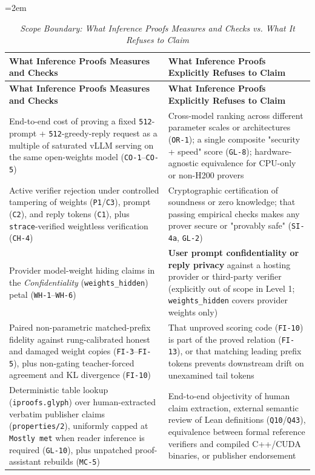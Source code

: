 \documentclass[11pt,letterpaper]{article}
\begin{document}
{\footnotesize\setlength{\tabcolsep}{4pt}\emergencystretch=2em
\begin{longtable}{@{}>{\raggedright\arraybackslash}p{} >{\raggedright\arraybackslash}p{}@{}}
\caption{\textit{Scope Boundary: What Inference Proofs Measures and Checks vs. What It Refuses to Claim} \cite{iproofs2026}} \\
\toprule
\textbf{What Inference Proofs Measures and Checks} & \textbf{What Inference Proofs Explicitly Refuses to Claim} \\
\midrule
\endfirsthead
\toprule
\textbf{What Inference Proofs Measures and Checks} & \textbf{What Inference Proofs Explicitly Refuses to Claim} \\
\midrule
\endhead
\bottomrule
\endfoot
End-to-end cost of proving a fixed \texttt{512}-prompt + \texttt{512}-greedy-reply request as a multiple of saturated vLLM serving on the same open-weights model (\texttt{CO-1}--\texttt{CO-5}) & Cross-model ranking across different parameter scales or architectures (\texttt{OR-1}); a single composite "security + speed" score (\texttt{GL-8}); hardware-agnostic equivalence for CPU-only or non-H200 provers \\
Active verifier rejection under controlled tampering of weights (\texttt{P1}/\texttt{C3}), prompt (\texttt{C2}), and reply tokens (\texttt{C1}), plus \texttt{strace}-verified weightless verification (\texttt{CH-4}) & Cryptographic certification of soundness or zero knowledge; that passing empirical checks makes any prover secure or "provably safe" (\texttt{SI-4a}, \texttt{GL-2}) \\
Provider model-weight hiding claims in the \textit{Confidentiality} (\texttt{weights\_\allowbreak{}hidden}) petal (\texttt{WH-1}--\texttt{WH-6}) & \textbf{User prompt confidentiality or reply privacy} against a hosting provider or third-party verifier (explicitly out of scope in Level 1; \texttt{weights\_\allowbreak{}hidden} covers provider weights only) \\
Paired non-parametric matched-prefix fidelity against rung-calibrated honest and damaged weight copies (\texttt{FI-3}--\texttt{FI-5}), plus non-gating teacher-forced agreement and KL divergence (\texttt{FI-10}) & That unproved scoring code (\texttt{FI-10}) is part of the proved relation (\texttt{FI-13}), or that matching leading prefix tokens prevents downstream drift on unexamined tail tokens \\
Deterministic table lookup (\texttt{iproofs.\allowbreak{}glyph}) over human-extracted verbatim publisher claims (\texttt{properties/\allowbreak{}2}), uniformly capped at \texttt{Mostly met} when reader inference is required (\texttt{GL-10}), plus unpatched proof-assistant rebuilds (\texttt{MC-5}) & End-to-end objectivity of human claim extraction, external semantic review of Lean definitions (\texttt{Q10}/\texttt{Q43}), equivalence between formal reference verifiers and compiled C++/CUDA binaries, or publisher endorsement \\

\end{longtable}}
\end{document}
